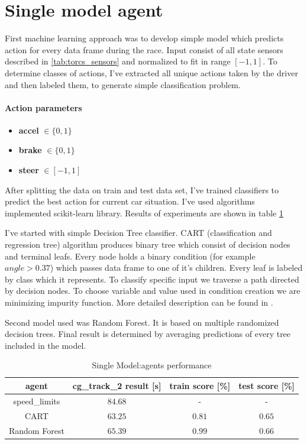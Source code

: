 \documentclass[declaration,shortabstract,english,inz]{iithesis}
\begin{document}
\section{Single model agent}



First machine learning approach was to develop simple model which predicts action for every data frame during the race. Input consist of all state sensors described  in \ref{tab:torcs_sensors} and normalized to fit in range $[-1,1]$. To determine classes of actions, I've extracted all unique actions taken by the driver and then labeled them, to generate simple classification problem.
\paragraph{Action parameters}
\begin{itemize}
    \item \textbf{accel} $\in \{0,1\}$
    \item \textbf{brake} $\in \{0,1\}$ 
    \item \textbf{steer} $\in [-1,1]$
\end{itemize}
After splitting the data on train and test data set, I've trained classifiers to predict the best action for current car situation. I've used algorithms implemented scikit-learn \cite{scikit_learn} library. Results of experiments are shown in table \ref{tab:single_clp_tree}


I've started with simple Decision Tree classifier. CART (classification and regression tree) algorithm produces binary tree which consist of decision nodes and terminal leafs. Every node holds a binary condition (for example $\textit{angle} > 0.37$) which passes data frame to one of it's children. Every leaf is labeled by class which it represents. To classify specific input we traverse a path directed by decision nodes. To choose variable and value used in condition creation we are minimizing impurity function. More detailed description can be found in \cite{Introduction_ML}.

Second model used was Random Forest. It is based on multiple randomized decision trees. Final result is determined by averaging predictions of every tree included in the model. 

\begin{table}[h]
    \centering
    \begin{tabular}{ |c|c|c|c|}
          \hline
          agent & cg\_track\_2 result [s] & train score [\%]& test score [\%]\\
          \hline
          speed\_limits & $84.68$ & - & -\\
          \hline
          CART &  $63.25$ & $0.81$ & $0.65$\\
          \hline
          Random Forest & $65.39$ & $0.99$ & $0.66$ \\
          \hline
          
        \end{tabular}
        \caption{Single Model:agents performance}
        \label{tab:single_clp_tree}

\end{table}
\end{document}
